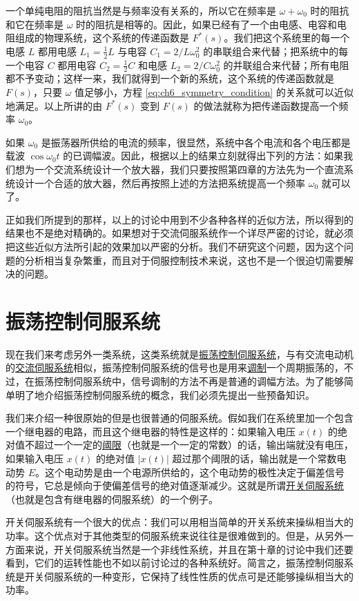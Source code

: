 一个单纯电阻的阻抗当然是与频率没有关系的，所以它在频率是 $\omega + \omega_0$ 时的阻抗和它在频率是 $\omega$ 时的阻抗是相等的。因此，如果已经有了一个由电感、电容和电阻组成的物理系统，这个系统的传递函数是 $F^*(s)$。我们把这个系统里的每一个电感 $L$ 都用电感 $L_1 = \frac{1}{2}L$ 与电容 $C_1 = 2/L\omega_0^2$ 的串联组合来代替；把系统中的每一个电容 $C$ 都用电容 $C_2 = \frac{1}{2}C$ 和电感 $L_2 = 2/C\omega_0^2$ 的并联组合来代替；所有电阻都不予变动；这样一来，我们就得到一个新的系统，这个系统的传递函数就是 $F(s)$，只要 $\omega$ 值足够小，方程 \eqref{eq:ch6_symmetry_condition} 的关系就可以近似地满足。以上所讲的由 $F^*(s)$ 变到 $F(s)$ 的做法就称为把传递函数提高一个频率 $\omega_0$。

如果 $\omega_0$ 是振荡器所供给的电流的频率，很显然，系统中各个电流和各个电压都是载波 $\cos \omega_0 t$ 的已调幅波。因此，根据以上的结果立刻就得出下列的方法：如果我们想为一个交流系统设计一个放大器，我们只要按照第四章的方法先为一个直流系统设计一个合适的放大器，然后再按照上述的方法把系统提高一个频率 $\omega_0$ 就可以了。

正如我们所提到的那样，以上的讨论中用到不少各种各样的近似方法，所以得到的结果也不是绝对精确的。如果想对于交流伺服系统作一个详尽严密的讨论，就必须把这些近似方法所引起的效果加以严密的分析。我们不研究这个问题，因为这个问题的分析相当复杂繁重，而且对于伺服控制技术来说，这也不是一个很迫切需要解决的问题。

\section{振荡控制伺服系统}\label{chapter6_section_3}

现在我们来考虑另外一类系统，这类系统就是\underline{振荡控制伺服系统}，与有交流电动机的\underline{交流伺服系统}相似，振荡控制伺服系统的信号也是用来\underline{调制}一个周期振荡的，不过，在振荡控制伺服系统中，信号调制的方法不再是普通的调幅方法。为了能够简单明了地介绍振荡控制伺服系统的概念，我们必须先提出一些预备知识。

我们来介绍一种很原始的但是也很普通的伺服系统。假如我们在系统里加一个包含一个继电器的电路，而且这个继电器的特性是这样的：如果输入电压 $x(t)$ 的绝对值不超过一个一定的\underline{阈限}（也就是一个一定的常数）的话，输出端就没有电压，如果输入电压 $x(t)$ 的绝对值 $|x(t)|$ 超过那个阈限的话，输出就是一个常数电动势 $E$。这个电动势是由一个电源所供给的，这个电动势的极性决定于偏差信号的符号，它总是倾向于使偏差信号的绝对值逐渐减少。这就是所谓\underline{开关伺服系统}（也就是包含有继电器的伺服系统）的一个例子。

开关伺服系统有一个很大的优点：我们可以用相当简单的开关系统来操纵相当大的功率。这个优点对于其他类型的伺服系统来说往往是很难做到的。但是，从另外一方面来说，开关伺服系统当然是一个非线性系统，并且在第十章的讨论中我们还要看到，它们的运转性能也不如以前讨论过的各种系统好。简言之，振荡控制伺服系统是开关伺服系统的一种变形，它保持了线性性质的优点可是还能够操纵相当大的功率。

